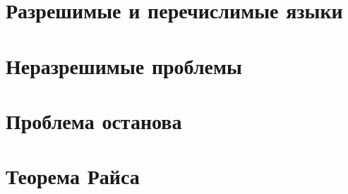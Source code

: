 


\section{Разрешимые и перечислимые языки}
\section{Неразрешимые проблемы}
\section{Проблема останова}
\section{Теорема Райса}

